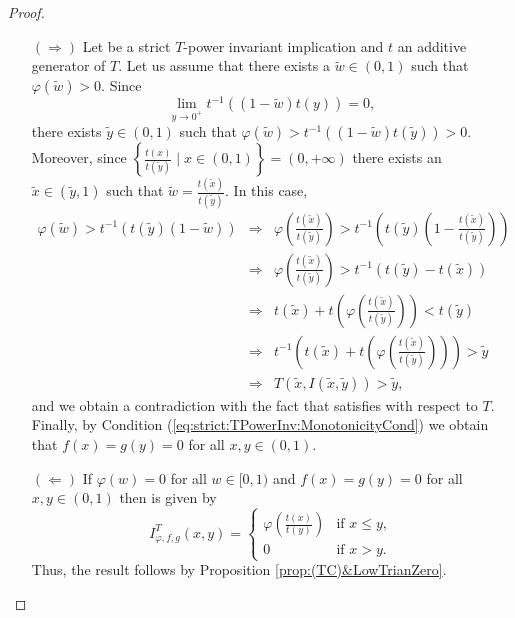 \begin{proof}
	\begin{itemize}
		\item[$(\Rightarrow)$] Let \IT be a strict $T$-power invariant implication and $t$ an additive generator of $T$. Let us assume that there exists a $\tilde{w} \in (0,1)$ such that $\varphi(\tilde{w})>0$. Since
		$$\lim_{ y \to 0^+}  t^{-1}((1-\tilde{w})t(y))=0,$$
		there exists $\tilde{y} \in (0,1)$ such that $\varphi(\tilde{w}) > t^{-1}((1-\tilde{w})t(\tilde{y}))>0$. Moreover, since \linebreak $\left\{\frac{t(x)}{t(\tilde{y})} \mid x \in (0,1)\right\} = (0,+\infty)$ there exists an $\tilde{x} \in (\tilde{y},1)$ such that $\tilde{w}=\frac{t(\tilde{x})}{t(\tilde{y})}$. In this case,
		\begin{eqnarray*}
			\varphi(\tilde{w})>t^{-1}(t(\tilde{y})(1-\tilde{w})) & \Rightarrow &  \varphi\left(\frac{t(\tilde{x})}{t(\tilde{y})}\right)>t^{-1}\left(t\left(\tilde{y}\right)\left(1-\frac{t(\tilde{x})}{t(\tilde{y})}\right)\right)\\
			& \Rightarrow &  \varphi\left(\frac{t(\tilde{x})}{t(\tilde{y})}\right)>t^{-1}\left(t(\tilde{y})-t(\tilde{x})\right) \\
			& \Rightarrow &  t(\tilde{x}) + t\left(\varphi\left(\frac{t(\tilde{x})}{t(\tilde{y})}\right)\right)<t(\tilde{y}) \\
			& \Rightarrow &  t^{-1}\left(t(\tilde{x}) + t\left(\varphi\left(\frac{t(\tilde{x})}{t(\tilde{y})}\right)\right)\right) > \tilde{y} \\
			& \Rightarrow &  T(\tilde{x},I(\tilde{x},\tilde{y})) > \tilde{y},
		\end{eqnarray*}
		and we obtain a contradiction with the fact that \IT satisfies \TC with respect to $T$. Finally, by Condition (\ref{eq:strict:TPowerInv:MonotonicityCond}) we obtain that $f(x)=g(y)=0$ for all $x,y \in (0,1)$.
		\item[$(\Leftarrow)$]  If $\varphi(w)=0$ for all $w \in [0,1)$ and $f(x)=g(y)=0$ for all $x,y \in (0,1)$ then \IT is given by 
		\begin{equation}
			I^T_{\varphi,f,g}(x,y) =\left\{ \begin{array}{ll}
				\varphi \left(\frac{t(x)}{t(y)}\right) &   \text{if }   x \leq y, \\
				0 &  \text{if }   x>y.
			\end{array}
			\right.
		\end{equation}
		Thus, the result follows by Proposition \ref{prop:(TC)&LowTrianZero}.
	\end{itemize}
\end{proof}


